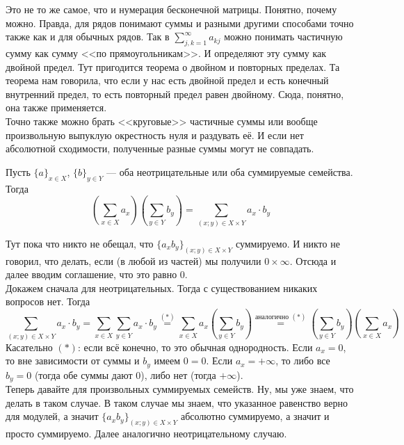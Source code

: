 \documentclass{article}
\begin{document}
\begin{itemize}
\begin{Comment}
$$            $$
            Это не то же самое, что и нумерация бесконечной матрицы. Понятно, почему можно. Правда, для рядов понимают суммы и разными другими способами точно также как и для обычных рядов. Так в $\sum\limits_{j,k=1}^\infty a_{kj}$ можно понимать частичную сумму как сумму <<по прямоугольникам>>. И определяют эту сумму как двойной предел. Тут пригодится теорема о двойном и повторных пределах. Та теорема нам говорила, что если у нас есть двойной предел и есть конечный внутренний предел, то есть повторный предел равен двойному. Сюда, понятно, она также применяется.\\
            Точно также можно брать <<круговые>> частичные суммы или вообще произвольную выпуклую окрестность нуля и раздувать её. И если нет абсолютной сходимости, полученные разные суммы могут не совпадать.
        \end{Comment}
        \thm Пусть $\{a\}_{x\in X}$, $\{b\}_{y\in Y}$ --- оба неотрицательные или оба суммируемые семейства. Тогда
        $$
        \left(\sum\limits_{x\in X}a_x\right)\left(\sum\limits_{y\in Y}b_y\right)=\sum\limits_{(x;y)\in X\times Y}a_x\cdot b_y
        $$
        \begin{Proof}
            Тут пока что никто не обещал, что $\{a_xb_y\}_{(x;y)\in X\times Y}$ суммируемо. И никто не говорил, что делать, если (в любой из частей) мы получили $0\times\infty$. Отсюда и далее вводим соглашение, что это равно $0$.\\
            Докажем сначала для неотрицательных. Тогда с существованием никаких вопросов нет. Тогда
            \[
            \sum\limits_{(x;y)\in X\times Y}a_x\cdot b_y=\sum\limits_{x\in X}\sum\limits_{y\in Y}a_x\cdot b_y\overset{(*)}=\sum\limits_{x\in X}a_x\left(\sum\limits_{y\in Y}b_y\right)\overset{\text{аналогично }(*)}=\left(\sum\limits_{y\in Y}b_y\right)\left(\sum\limits_{x\in X}a_x\right)
            \]
            Касательно $(*)$: если всё конечно, то это обычная однородность. Если $a_x=0$, то вне зависимости от суммы и $b_y$ имеем $0=0$. Если $a_x=+\infty$, то либо все $b_y=0$ (тогда обе суммы дают 0), либо нет (тогда $+\infty$).\\
            Теперь давайте для произвольных суммируемых семейств. Ну, мы уже знаем, что делать в таком случае. В таком случае мы знаем, что указанное равенство верно для модулей, а значит $\{a_xb_y\}_{(x;y)\in X\times Y}$ абсолютно суммируемо, а значит и просто суммируемо. Далее аналогично неотрицательному случаю.
        \end{Proof}
        \begin{Comment}

\end{Comment}
\end{itemize}
\end{document}

